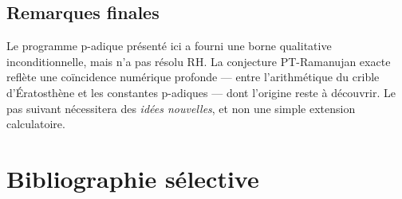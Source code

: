\documentclass[11pt,a4paper]{article}
\theoremstyle{definition}
\begin{document}
\subsection{Remarques finales}

Le programme p-adique présenté ici a fourni une borne qualitative
inconditionnelle, mais n'a pas résolu RH. La conjecture PT-Ramanujan
exacte reflète une coïncidence numérique profonde — entre
l'arithmétique du crible d'Ératosthène et les constantes p-adiques —
dont l'origine reste à découvrir. Le pas suivant nécessitera des
\emph{idées nouvelles}, et non une simple extension calculatoire.

\section*{Bibliographie sélective}
\end{document}
